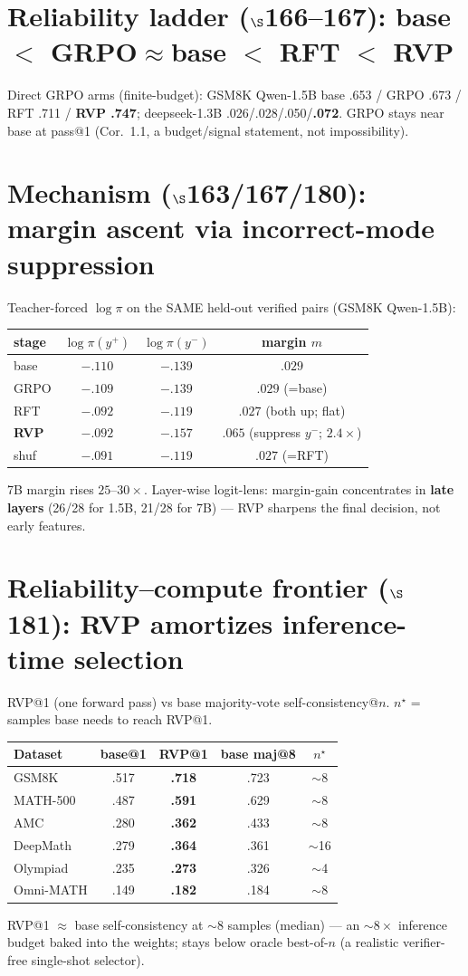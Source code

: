 \documentclass[a4paper,10pt]{article}
\newcommand{\best}[1]{\textbf{#1}}
\begin{document}
\section{Reliability ladder ($\S$166--167): base $<$ GRPO$\approx$base $<$ RFT $<$ RVP}
Direct GRPO arms (finite-budget): GSM8K Qwen-1.5B base .653 / GRPO .673 / RFT .711 / \best{RVP .747};
deepseek-1.3B .026/.028/.050/\best{.072}. GRPO stays near base at pass@1 (Cor.~1.1, a budget/signal
statement, not impossibility).

\section{Mechanism ($\S$163/167/180): margin ascent via incorrect-mode suppression}
Teacher-forced $\log\pi$ on the SAME held-out verified pairs (GSM8K Qwen-1.5B):
\begin{longtable}{lccc}
\toprule
stage & $\log\pi(y^{+})$ & $\log\pi(y^{-})$ & margin $m$ \\
\midrule
base & $-.110$ & $-.139$ & $.029$ \\
GRPO & $-.109$ & $-.139$ & $.029$ (=base) \\
RFT  & $-.092$ & $-.119$ & $.027$ (both up; flat) \\
\best{RVP} & $-.092$ & \best{$-.157$} & \best{$.065$} (suppress $y^-$; $2.4\times$) \\
shuf & $-.091$ & $-.119$ & $.027$ (=RFT) \\
\bottomrule
\end{longtable}
7B margin rises $25$--$30\times$. Layer-wise logit-lens: margin-gain concentrates in \textbf{late layers}
(26/28 for 1.5B, 21/28 for 7B) --- RVP sharpens the final decision, not early features.

\section{Reliability--compute frontier ($\S$181): RVP amortizes inference-time selection}
RVP@1 (one forward pass) vs base majority-vote self-consistency@$n$. $n^{\star}$ = samples base needs to
reach RVP@1.
\begin{longtable}{lcccc}
\toprule
Dataset & base@1 & \best{RVP@1} & base maj@8 & $n^{\star}$ \\
\midrule
GSM8K & .517 & \best{.718} & .723 & $\sim$8 \\
MATH-500 & .487 & \best{.591} & .629 & $\sim$8 \\
AMC & .280 & \best{.362} & .433 & $\sim$8 \\
DeepMath & .279 & \best{.364} & .361 & $\sim$16 \\
Olympiad & .235 & \best{.273} & .326 & $\sim$4 \\
Omni-MATH & .149 & \best{.182} & .184 & $\sim$8 \\
\bottomrule
\end{longtable}
RVP@1 $\approx$ base self-consistency at $\sim\!8$ samples (median) --- an $\sim\!8\times$ inference budget
baked into the weights; stays below oracle best-of-$n$ (a realistic verifier-free single-shot selector).
\end{document}
